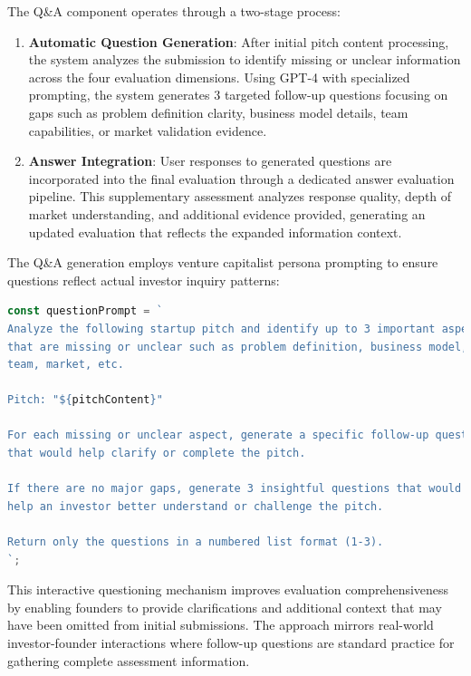 The Q\&A component operates through a two-stage process:

\begin{enumerate}
  \item \textbf{Automatic Question Generation}: After initial pitch content processing, the system analyzes the submission to identify missing or unclear information across the four evaluation dimensions. Using GPT-4 with specialized prompting, the system generates 3 targeted follow-up questions focusing on gaps such as problem definition clarity, business model details, team capabilities, or market validation evidence.
  
  \item \textbf{Answer Integration}: User responses to generated questions are incorporated into the final evaluation through a dedicated answer evaluation pipeline. This supplementary assessment analyzes response quality, depth of market understanding, and additional evidence provided, generating an updated evaluation that reflects the expanded information context.
\end{enumerate}

The Q\&A generation employs venture capitalist persona prompting to ensure questions reflect actual investor inquiry patterns:

\begin{lstlisting}[language=TypeScript, caption=Q\&A Generation Implementation, label=lst:qa-generation]
const questionPrompt = `
Analyze the following startup pitch and identify up to 3 important aspects 
that are missing or unclear such as problem definition, business model, 
team, market, etc.

Pitch: "${pitchContent}"

For each missing or unclear aspect, generate a specific follow-up question 
that would help clarify or complete the pitch.

If there are no major gaps, generate 3 insightful questions that would 
help an investor better understand or challenge the pitch.

Return only the questions in a numbered list format (1-3).
`;
\end{lstlisting}

This interactive questioning mechanism improves evaluation comprehensiveness by enabling founders to provide clarifications and additional context that may have been omitted from initial submissions. The approach mirrors real-world investor-founder interactions where follow-up questions are standard practice for gathering complete assessment information.

